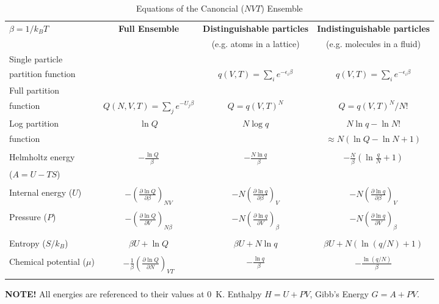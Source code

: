 \documentclass[11pt]{article}
\begin{document}
\begin{outline}
\begin{table}\small
  \begin{center}
    \caption{Equations of the Canoncial ($NVT$) Ensemble}
    \label{Canonical}
    \begin{tabular}[h]{lccc}
      \hline
$\beta=1/k_BT$ & {\bf Full Ensemble} & {\bf Distinguishable particles} & {\bf Indistinguishable
particles} \\
               &               & (e.g. atoms in a lattice) & (e.g. molecules in
               a fluid) \\
\hline
Single particle & & & \\partition function& & $\displaystyle q(V,T) = \sum_i
e^{-\epsilon_i\beta} $& $\displaystyle q(V,T) = \sum_i e^{-\epsilon_i\beta} $ \\
Full partition & & & \\function & $\displaystyle Q(N,V,T) = \sum_j e^{-U_j\beta} $ &
$\displaystyle Q = q(V,T)^N $ & $\displaystyle Q = q(V,T)^N/N! $ \\
Log partition &  $\ln Q$ & $N\log q$ & $ N\ln q - \ln N! $\\
function & & & $\approx N(\ln Q - \ln N +1)$ \\ & & & \\
Helmholtz energy & $\displaystyle -\frac{\ln Q}{\beta}$ & $\displaystyle
-\frac{N\ln q}{\beta}$ & $\displaystyle -\frac{N}{\beta}\left (\ln\frac{q}{N} +
  1 \right ) $ \\
($A=U-TS$) & & & \\ & & &  \\
Internal energy ($U$)& $\displaystyle -\left (\frac{\partial\ln
    Q}{\partial\beta}\right )_{NV}$ & $\displaystyle -N\left (\frac{\partial\ln
    q}{\partial\beta}\right )_{V}$ &  $\displaystyle -N\left (\frac{\partial\ln
    q}{\partial\beta}\right )_{V}$ \\ & & & \\
Pressure ($P$) & $\displaystyle -\left (\frac{\partial\ln
    Q}{\partial V}\right )_{N\beta}$ & $\displaystyle -N\left (\frac{\partial\ln
    q}{\partial V}\right )_{\beta}$ &  $\displaystyle -N\left (\frac{\partial\ln
    q}{\partial V}\right )_{\beta}$ \\ & & & \\

Entropy ($S/k_B$) & $ \beta U + \ln Q$ & $\beta U + N \ln q$ & $\beta U +
N\left ( \ln(q/N) + 1\right )$ \\ & & & \\
Chemical potential ($\mu$) & $\displaystyle -\frac{1}{\beta}\left ( \frac{\partial \ln
    Q}{\partial N}\right )_{VT} $& $\displaystyle -\frac{\ln q}{\beta}$ & $\displaystyle
-\frac{\ln (q/N)}{\beta}$ \\ & & & \\
\hline
    \end{tabular}
{\bf NOTE!} All energies are referenced to their values at 0~K.  Enthalpy $H=U+PV$, Gibb's
Energy $G=A+PV$.
  \end{center}
\end{table}


\end{outline}
\end{document}
